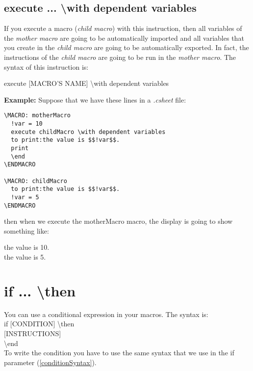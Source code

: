 \documentclass[11pt,a4paper,openright,oneside]{book}
\newenvironment{ex}
{
  \setlength{\parindent}{0cm}
  \large \textbf{Example:} \normalsize 
}
{}
\begin{document}
\subsection{\textsf{execute ... \textbackslash with dependent variables}}

If you execute a macro (\textit{child macro}) with this instruction, then all variables of the \textit{mother macro} are going to be automatically imported and all variables that you create in the \textit{child macro} are going to be automatically exported. In fact, the instructions of the \textit{child macro} are going to be run in the \textit{mother macro}. The syntax of this instruction is:
\begin{center} \textsf{execute \textsc{\scriptsize[MACRO'S NAME]} \textbackslash with dependent variables} \end{center}

\begin{ex} Suppose that we have these lines in a \textit{.csheet} file:
  \begin{lstlisting}
\MACRO: motherMacro
  !var = 10
  execute childMacro \with dependent variables
  to print:the value is $$!var$$.
  print
  \end
\ENDMACRO

\MACRO: childMacro
  to print:the value is $$!var$$.
  !var = 5
\ENDMACRO
  \end{lstlisting}
then when we execute the \textsf{motherMacro} macro, the display is going to show something like:
\vspace{5px}

\textsf{the value is 10.\\
the value is 5.}
  
\end{ex}

\section{\textsf{if ... \textbackslash then}}

You can use a conditional expression in your macros. The syntax is: \vspace{5px} \\
\textsf{if \textsc{\scriptsize[CONDITION]} \textbackslash then} \\
\textsc{\scriptsize[INSTRUCTIONS]} \\
\textsf{\textbackslash end} \\

To write the condition you have to use the same syntax that we use in the \textsf{if} parameter (\ref{conditionSyntax}).
\end{document}
